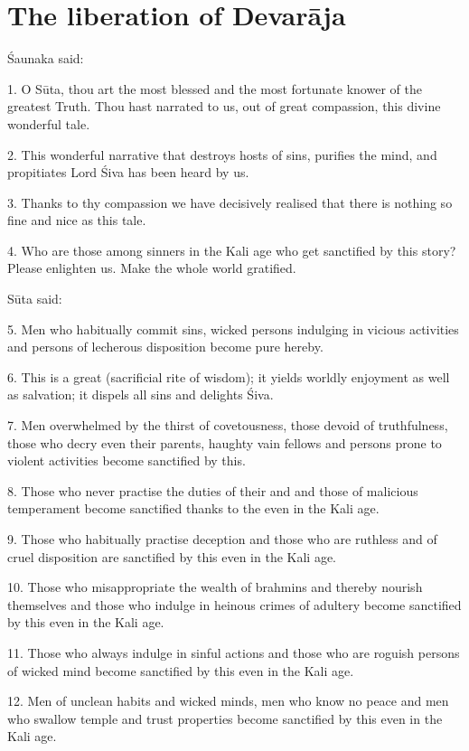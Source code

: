 \chapter{The liberation of Devarāja}

Śaunaka said:

1. O Sūta, thou art the most blessed and the most fortunate knower of the
greatest Truth. Thou hast narrated to us, out of great compassion, this divine
wonderful tale.

2. This wonderful narrative that destroys hosts of sins, purifies the mind,
and propitiates Lord Śiva has been heard by us.

3. Thanks to thy compassion we have decisively realised that there is nothing so
fine and nice as this tale.

4. Who are those among sinners in the Kali age who get sanctified by this story?
Please enlighten us. Make the whole world gratified.

Sūta said:

5. Men who habitually commit sins, wicked persons indulging in vicious
activities and persons of lecherous disposition become pure hereby.

6. This is a great  (sacrificial rite of wisdom); it yields
worldly enjoyment as well as salvation; it dispels all sins and delights Śiva.

7. Men overwhelmed by the thirst of covetousness, those devoid of truthfulness,
those who decry even their parents, haughty vain fellows and persons prone to
violent activities become sanctified by this.

8. Those who never practise the duties of their  and  and
those of malicious temperament become sanctified thanks to the 
even in the Kali age.

9. Those who habitually practise deception and those who are ruthless and of
cruel disposition are sanctified by this  even in the Kali age.

10. Those who misappropriate the wealth of brahmins and thereby nourish
themselves and those who indulge in heinous crimes of adultery become sanctified
by this  even in the Kali age.

11. Those who always indulge in sinful actions and those who are roguish persons
of wicked mind become sanctified by this  even in the Kali age.

12. Men of unclean habits and wicked minds, men who know no peace and men who
swallow temple and trust properties become sanctified by this 
even in the Kali age.

